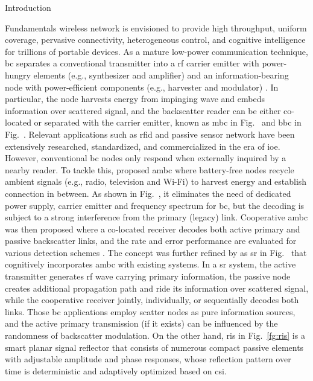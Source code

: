 \documentclass[journal]{IEEEtran}
\begin{document}
\begin{section}{Introduction}
	\begin{subsection}{Fundamentals}
		 wireless network is envisioned to provide high throughput, uniform coverage, pervasive connectivity, heterogeneous control, and cognitive intelligence for trillions of portable devices.
		As a mature low-power communication technique, \gls{bc} separates a conventional transmitter into a \gls{rf} carrier emitter with power-hungry elements (e.g., synthesizer and amplifier) and an information-bearing node with power-efficient components (e.g., harvester and modulator) \cite{Boyer2014}.
		In particular, the node harvests energy from impinging wave and embeds information over scattered signal, and the backscatter reader can be either co-located or separated with the carrier emitter, known as \gls{mbc} in Fig.~ and \gls{bbc} in Fig.~.
		Relevant applications such as \gls{rfid} \cite{Dobkin2012,Landt2005} and passive sensor network \cite{Vannucci2008,Assimonis2016} have been extensively researched, standardized, and commercialized in the era of \gls{ioe}.
		However, conventional \gls{bc} nodes only respond when externally inquired by a nearby reader.
		To tackle this, \cite{Liu2013b} proposed \gls{ambc} where battery-free nodes recycle ambient signals (e.g., radio, television and Wi-Fi) to harvest energy and establish connection in between.
		As shown in Fig.~, it eliminates the need of dedicated power supply, carrier emitter and frequency spectrum for \gls{bc}, but the decoding is subject to a strong interference from the primary (legacy) link.
		Cooperative \gls{ambc} was then proposed where a co-located receiver decodes both active primary and passive backscatter links, and the rate and error performance are evaluated for various detection schemes \cite{Yang2018}.
		The concept was further refined by \cite{Liang2020} as \gls{sr} in Fig.~ that cognitively incorporates \gls{ambc} with existing systems.
		In a \gls{sr} system, the active transmitter generates \gls{rf} wave carrying primary information, the passive node creates additional propagation path and ride its information over scattered signal, while the cooperative receiver jointly, individually, or sequentially decodes both links.
		Those \gls{bc} applications employ scatter nodes as pure information sources, and the active primary transmission (if it exists) can be influenced by the randomness of backscatter modulation.
		On the other hand, \gls{ris} in Fig.~\ref{fg:ris} is a smart planar signal reflector that consists of numerous compact passive elements with adjustable amplitude and phase responses, whose reflection pattern over time is deterministic and adaptively optimized based on \gls{csi}.

\end{subsection}
\end{section}
\end{document}
